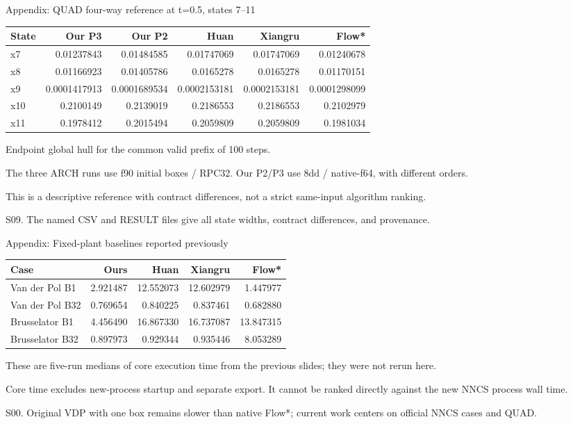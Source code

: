 \documentclass[aspectratio=169,11pt]{beamer}
\newcommand{\src}[1]{\par\vfill{\fontsize{7}{9}\selectfont\color{gray}#1\par}}
\begin{document}
\begin{frame}[t]{Appendix: QUAD four-way reference at t=0.5, states 7–11}
\relax
\relax
{\footnotesize\setlength{\tabcolsep}{3.2pt}\renewcommand{\arraystretch}{1.18}
\noindent\begin{tabular*}{\linewidth}{@{\extracolsep{\fill}}lrrrrr@{}}\toprule
\textbf{State} & \textbf{Our P3} & \textbf{Our P2} & \textbf{Huan} & \textbf{Xiangru} & \textbf{Flow*}\\ \midrule
x7 & 0.01237843 & 0.01484585 & 0.01747069 & 0.01747069 & 0.01240678\\
x8 & 0.01166923 & 0.01405786 & 0.0165278 & 0.0165278 & 0.01170151\\
x9 & 0.0001417913 & 0.0001689534 & 0.0002153181 & 0.0002153181 & 0.0001298099\\
x10 & 0.2100149 & 0.2139019 & 0.2186553 & 0.2186553 & 0.2102979\\
x11 & 0.1978412 & 0.2015494 & 0.2059809 & 0.2059809 & 0.1981034\\
\bottomrule\end{tabular*}\par{}}\vspace{0.35cm}Endpoint global hull for the common valid prefix of 100 steps.\par{}The three ARCH runs use f90 initial boxes / RPC32. Our P2/P3 use 8dd / native-f64, with different orders.\par{}This is a descriptive reference with contract differences, not a strict same-input algorithm ranking.
\src{S09. The named CSV and RESULT files give all state widths, contract differences, and provenance.}
\end{frame}

\begin{frame}[t]{Appendix: Fixed-plant baselines reported previously}
\relax
\relax
{\small\setlength{\tabcolsep}{3.2pt}\renewcommand{\arraystretch}{1.18}
\noindent\begin{tabular*}{\linewidth}{@{\extracolsep{\fill}}lrrrr@{}}\toprule
\textbf{Case} & \textbf{Ours} & \textbf{Huan} & \textbf{Xiangru} & \textbf{Flow*}\\ \midrule
Van der Pol B1 & 2.921487 & 12.552073 & 12.602979 & 1.447977\\
Van der Pol B32 & 0.769654 & 0.840225 & 0.837461 & 0.682880\\
Brusselator B1 & 4.456490 & 16.867330 & 16.737087 & 13.847315\\
Brusselator B32 & 0.897973 & 0.929344 & 0.935446 & 8.053289\\
\bottomrule\end{tabular*}\par{}}\vspace{0.35cm}These are five-run medians of core execution time from the previous slides; they were not rerun here.\par{}Core time excludes new-process startup and separate export. It cannot be ranked directly against the new NNCS process wall time.
\src{S00. Original VDP with one box remains slower than native Flow*; current work centers on official NNCS cases and QUAD.}
\end{frame}
\end{document}
